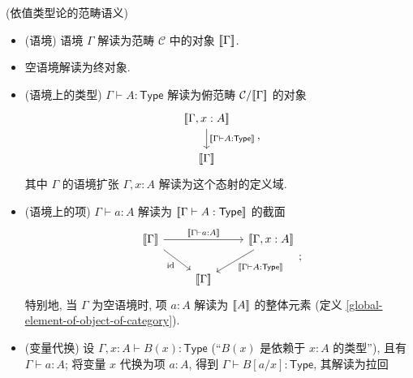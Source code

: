 \begin{example}
	{(依值类型论的范畴语义)}
	\begin{itemize}
		\item (语境) 语境 $\Gamma$ 解读为范畴 $\mathcal C$ 中的对象 ${[\![\Gamma]\!]}$.
		\item 空语境解读为终对象.
		\item (语境上的类型) $\Gamma\vdash A:\mathsf {Type}$ %
		解读为俯范畴 $\mathcal C/{[\![\Gamma]\!]}$ 的对象
		$$
		\begin{tikzcd}[ampersand replacement=\&]
			\interpretation{\Gamma,x:A} \\
			\interpretation{\Gamma}
			\arrow["\interpretation{\Gamma\vdash A : \mathsf {Type}}",from=1-1, to=2-1]
		\end{tikzcd},
		$$
		其中 $\Gamma$ 的语境扩张 $\Gamma,x:A$ 解读为这个态射的定义域.
		\item (语境上的项) $\Gamma\vdash a:A$ %
		解读为 ${[\![\Gamma\vdash A : \mathsf {Type}]\!]}$ 的截面
		\[\begin{tikzcd}[ampersand replacement=\&]
			{\interpretation{\Gamma}} \&\& {\interpretation{\Gamma,x:A}} \\
			\& {\interpretation{\Gamma}}
			\arrow["{\interpretation{\Gamma\vdash a:A}}", from=1-1, to=1-3]
			\arrow["{\operatorname{id}}"', from=1-1, to=2-2]
			\arrow["{\interpretation{\Gamma\vdash A : \mathsf {Type}}}", from=1-3, to=2-2]
		\end{tikzcd};\]
		特别地, 当 $\Gamma$ 为空语境时, 项 $a:A$ 解读为 ${[\![A]\!]}$ 的整体元素 (定义 \ref{global-element-of-object-of-category}).
		\item (变量代换) 设 $\Gamma,x:A\vdash B(x):\mathsf{Type}$ (``$B(x)$ 是依赖于 $x:A$ 的类型''), 且有 $\Gamma\vdash a:A$; 将变量 $x$ 代换为项 $a:A$, 得到 $\Gamma\vdash B[a/x] :\mathsf {Type}$, 其解读为拉回

\end{itemize}
\end{example}
